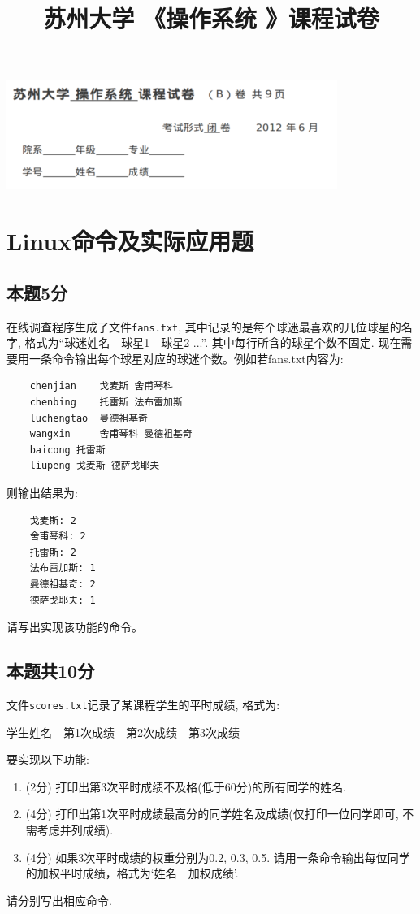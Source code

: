 \documentclass[a4paper,11pt]{article}
\title{苏州大学 《操作系统 》课程试卷}
\date{}
\begin{document}
\begin{CJK*}{UTF8}{gbsn}

\includegraphics{headofpaperB.png}
\section{Linux命令及实际应用题}

\subsection{本题5分}
在线调查程序生成了文件\verb|fans.txt|, 其中记录的是每个球迷最喜欢的几位球星的名字, 格式为``球迷姓名\ \ 球星1\ \ 球星2 ...''.
其中每行所含的球星个数不固定. 现在需要用一条命令输出每个球星对应的球迷个数。例如若fans.txt内容为:
\begin{verbatim}
    chenjian 	戈麦斯 舍甫琴科
    chenbing 	托雷斯 法布雷加斯
    luchengtao  曼德祖基奇
    wangxin 	舍甫琴科 曼德祖基奇
    baicong	托雷斯
    liupeng	戈麦斯 德萨戈耶夫
\end{verbatim}
则输出结果为:
\begin{verbatim}
    戈麦斯: 2
    舍甫琴科: 2
    托雷斯: 2
    法布雷加斯: 1
    曼德祖基奇: 2
    德萨戈耶夫: 1
\end{verbatim}
请写出实现该功能的命令。
\\[1.5in]

\subsection{本题共10分}
文件\verb|scores.txt|记录了某课程学生的平时成绩, 格式为: 

学生姓名\ \ 第1次成绩\ \  第2次成绩\ \ 第3次成绩

\noindent 要实现以下功能:
\begin{enumerate}
\item (2分) 打印出第3次平时成绩不及格(低于60分)的所有同学的姓名.
\item (4分) 打印出第1次平时成绩最高分的同学姓名及成绩(仅打印一位同学即可, 不需考虑并列成绩).
\item (4分) 如果3次平时成绩的权重分别为0.2, 0.3, 0.5. 请用一条命令输出每位同学的加权平时成绩，格式为`姓名\ \ 加权成绩'.
\end{enumerate}
请分别写出相应命令.
\\[1.5in]


\end{CJK*}
\end{document}
